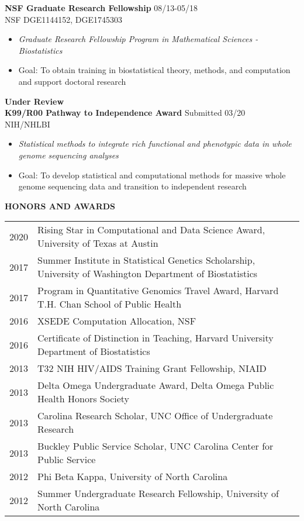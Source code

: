 \documentclass[10pt]{article}
\begin{document}
\textbf{NSF Graduate Research Fellowship} \hfill 08/13-05/18\\
\indent NSF DGE1144152, DGE1745303
\begin{itemize}
	\item \textit{Graduate Research Fellowship Program in Mathematical Sciences - Biostatistics}
	\item Goal: To obtain training in biostatistical theory, methods, and computation and support doctoral research\\
\end{itemize}


\indent \textbf{Under Review}  \\

\textbf{K99/R00 Pathway to Independence Award} \hfill Submitted 03/20\\
\indent NIH/NHLBI
\begin{itemize}
	\item \textit{Statistical methods to integrate rich functional and phenotypic data in whole genome sequencing analyses}
	\item Goal: To develop statistical and computational methods for massive whole genome sequencing data and transition to independent research \\
\end{itemize}

\vspace{0.25cm}

{ \bf HONORS AND AWARDS} \hrulefill \\
 \setlength\intextsep{0mm}
\begin{center}
	\begin{table}[H]
		\centering
		\begin{tabular}{@{}p{1.3cm}@{}@{}p{16.2cm}@{}}
			2020 & Rising Star in Computational and Data Science Award, University of Texas at Austin \\
			2017  & Summer Institute in Statistical Genetics Scholarship, University of Washington Department of Biostatistics  \\ 
			2017  & Program in Quantitative Genomics Travel Award, Harvard T.H. Chan School of Public Health  \\ 
			2016  & XSEDE Computation Allocation, NSF            \\ 
			2016  & Certificate of Distinction in Teaching, Harvard University Department of Biostatistics             \\ 
			2013 & T32 NIH HIV/AIDS Training Grant Fellowship, NIAID \\
			2013  & Delta Omega Undergraduate Award, Delta Omega Public Health Honors Society       \\ 
			2013  & Carolina Research Scholar, UNC Office of Undergraduate Research   \\ 
			2013  & Buckley Public Service Scholar, UNC Carolina Center for Public Service    \\ 
			2012  &Phi Beta Kappa, University of North Carolina \\
			2012  & Summer Undergraduate Research Fellowship, University of North Carolina  
		\end{tabular}
	\end{table}
\end{center}
\end{document}
